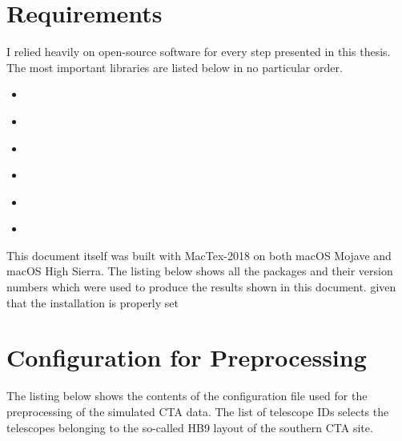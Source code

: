 \section{\python Requirements}
\label{sec:requirements}
I relied heavily on open-source software for every step presented in this thesis.
The most important libraries are listed below in no particular order.
\begin{itemize}
  \item \astropy~\cite{astropy_2013,astropy_2018}
  \item \numpy~\cite{numpy}
  \item \pandas~\cite{pandas}
  \item \sklearn~\cite{sklearn}
  \item \matplotlib~\cite{matplotlib}
  \item \scipy~\cite{scipy}
\end{itemize}

This document itself was built with MacTex-2018 on both macOS Mojave and macOS High Sierra.
The listing below shows all the \python packages and their version numbers which were used to produce the results shown in this document.
given that the \python installation is properly set
\begin{spacing}{0.5}
  
\end{spacing}

\section{Configuration for Preprocessing}
\label{ap:preprocess_config}

The listing below shows the contents of the configuration file used for the preprocessing 
of the simulated CTA data. The list of telescope IDs selects the telescopes belonging to 
the so-called HB9 layout of the southern CTA site.

\begin{spacing}{0.6}
  
\end{spacing}